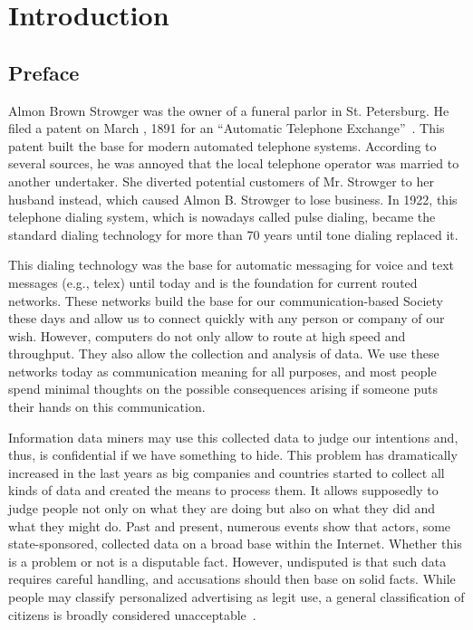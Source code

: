 


\part{Introduction}
\chapter{Preface}
Almon Brown Strowger was the owner of a funeral parlor in St. Petersburg. He filed a patent on March , 1891 for an ``Automatic Telephone Exchange''~\cite{pulseDialingPatent}. This patent built the base for modern automated telephone systems. According to several sources, he was annoyed that the local telephone operator was married to another undertaker. She diverted potential customers of Mr. Strowger to her husband instead, which caused Almon B. Strowger to lose business. In 1922, this telephone dialing system, which is nowadays called pulse dialing, became the standard dialing technology for more than 70 years until tone dialing replaced it.

This dialing technology was the base for automatic messaging for voice and text messages (e.g., telex) until today and is the foundation for current routed networks. These networks build the base for our communication-based Society these days and allow us to connect quickly with any person or company of our wish. However, computers do not only allow to route at high speed and throughput. They also allow the collection and analysis of data. We use these networks today as communication meaning for all purposes, and most people spend minimal thoughts on the possible consequences arising if someone puts their hands on this communication. 

Information data miners may use this collected data to judge our intentions and, thus, is confidential if we have something to hide. This problem has dramatically increased in the last years as big companies and countries started to collect all kinds of data and created the means to process them. It allows supposedly to judge people not only on what they are doing but also on what they did and what they might do. Past and present, numerous events show that actors, some state-sponsored, collected data on a broad base within the Internet. Whether this is a problem or not is a disputable fact. However, undisputed is that such data requires careful handling, and accusations should then base on solid facts. While people may classify personalized advertising as legit use, a general classification of citizens is broadly considered unacceptable~\cite{NCR2013,XKeyscore,Ball2013,Greenberg2013,Leuenberger1989}.

